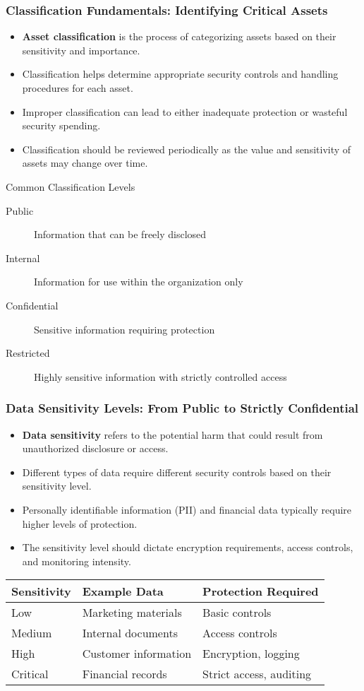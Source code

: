 \documentclass{beamer}
\begin{document}
\begin{frame}
\frametitle{Classification Fundamentals: Identifying Critical Assets}
\begin{itemize}
\item \textbf{Asset classification} is the process of categorizing assets based on their sensitivity and importance.
\item Classification helps determine appropriate security controls and handling procedures for each asset.
\item Improper classification can lead to either inadequate protection or wasteful security spending.
\item Classification should be reviewed periodically as the value and sensitivity of assets may change over time.
\end{itemize}

\begin{alertblock}{Common Classification Levels}
\begin{description}
\item[Public] Information that can be freely disclosed
\item[Internal] Information for use within the organization only
\item[Confidential] Sensitive information requiring protection
\item[Restricted] Highly sensitive information with strictly controlled access
\end{description}
\end{alertblock}
\end{frame}

\begin{frame}
\frametitle{Data Sensitivity Levels: From Public to Strictly Confidential}
\begin{itemize}
\item \textbf{Data sensitivity} refers to the potential harm that could result from unauthorized disclosure or access.
\item Different types of data require different security controls based on their sensitivity level.
\item Personally identifiable information (PII) and financial data typically require higher levels of protection.
\item The sensitivity level should dictate encryption requirements, access controls, and monitoring intensity.
\end{itemize}

\begin{table}
\begin{tabular}{|l|l|l|}
\hline
\textbf{Sensitivity} & \textbf{Example Data} & \textbf{Protection Required} \\
\hline
Low & Marketing materials & Basic controls \\
Medium & Internal documents & Access controls \\
High & Customer information & Encryption, logging \\
Critical & Financial records & Strict access, auditing \\
\hline
\end{tabular}
\end{table}
\end{frame}
\end{document}
